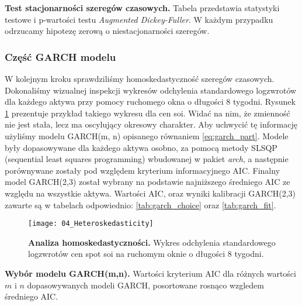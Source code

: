 \begin{table}
	\centering
	
	\caption{\textbf{Test stacjonarności szeregów czasowych.} Tabela przedstawia statystyki testowe i p-wartości testu \emph{Augmented Dickey-Fuller}. W każdym przypadku odrzucamy hipotezę zerową o niestacjonarności szeregów.
		\label{tab:adf_test}}
\end{table}

\FloatBarrier
\subsubsection{Część GARCH modelu}
W kolejnym kroku sprawdziliśmy homoskedastyczność szeregów czasowych. Dokonaliśmy wizualnej inspekcji wykresów odchylenia standardowego logzwrotów dla każdego aktywa przy pomocy ruchomego okna o długości $8$ tygodni. Rysunek \ref{fig:homoskedasticity} prezentuje przykład takiego wykresu dla cen soi. Widać na nim, że zmienność nie jest stała, lecz ma oscylujący okresowy charakter. Aby uchwycić tę informację użyliśmy modelu GARCH(m, n) opisanego równaniem \ref{eq:garch_part}. Modele były dopasowywane dla każdego aktywa osobno, za pomocą metody SLSQP (sequential least squares programming) wbudowanej w pakiet \emph{arch}, a następnie porównywane zostały pod względem kryterium informacyjnego AIC. Finalny model GARCH(2,3) został wybrany na podstawie najniższego średniego AIC ze względu na wszystkie aktywa. Wartości AIC, oraz wyniki kalibracji GARCH(2,3) zawarte są w tabelach odpowiednio: \ref{tab:garch_choice} oraz \ref{tab:garch_fit}.

\begin{figure}[h]
	\centering
	\texttt{[image: 04\_Heteroskedasticity]}
	\caption{\textbf{Analiza homoskedastyczności.} Wykres odchylenia standardowego logzwrotów cen spot soi na ruchomym oknie o długości 8 tygodni. \label{fig:homoskedasticity}}
\end{figure}

\begin{table}
	\centering
	
	\caption{\textbf{Wybór modelu GARCH(m,n).} Wartości kryterium AIC dla różnych wartości $m$ i $n$ dopasowywanych modeli GARCH, posortowane rosnąco wzgledem średniego AIC. \label{tab:garch_choice}}
\end{table}

